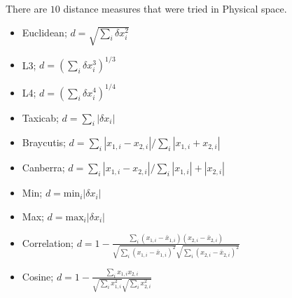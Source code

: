 There are \(10\) distance measures that were tried in Physical space.
\begin{itemize}
    \item Euclidean; \(d = \sqrt{\sum_i \delta x_i^2}\)
    \item L3; \(d = {(\sum_i \delta x_i^3)}^{1/3}\)
    \item L4; \(d = {(\sum_i \delta x_i^4)}^{1/4}\)
    \item Taxicab; \(d = \sum_i |\delta x_i|\)
    \item Braycutis; \(d = \sum_i |x_{1,i} - x_{2,i}|/\sum_i |x_{1,i} + x_{2,i}|\)
    \item Canberra; \(d = \sum_i |x_{1,i} - x_{2,i}|/\sum_i |x_{1,i}| + |x_{2,i}|\)
    \item Min; \(d = \text{min}_i |\delta x_i|\)
    \item Max; \(d = \text{max}_i |\delta x_i|\)
\item Correlation; \(d = 1 - \frac{\sum_i (x_{1,i} - \bar{x}_{1,i})(x_{2,i} - \bar{x}_{2,i})}
                                  {\sqrt{\sum_i (x_{1,i} - \bar{x}_{1,i})^2}\sqrt{\sum_i (x_{2,i} - \bar{x}_{2,i})^2}}\)
\item Cosine; \(d = 1 - \frac{\sum_i x_{1,i}x_{2,i}}
                                  {\sqrt{\sum_i x_{1,i}^2}\sqrt{\sum_i x_{2,i}^2}}\)
\end{itemize}


